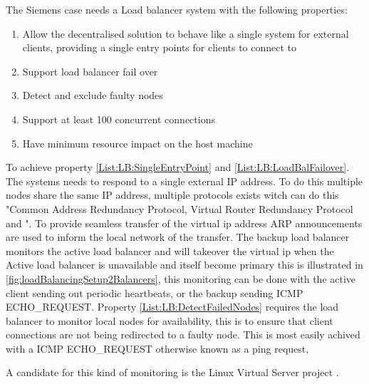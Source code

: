 The Siemens case needs a Load balancer system with the following properties:
\begin{enumerate}[label=\textbf{P.\arabic*}, ref=\textit{P.\arabic*}]
	\item \label{List:LB:SingleEntryPoint}Allow the decentralised solution to behave like a single system for external clients, providing a single entry points for clients to connect to
	\item \label{List:LB:LoadBalFailover} Support load balancer fail over
	\item \label{List:LB:DetectFailedNodes} Detect and exclude faulty nodes 
	\item Support at least 100 concurrent connections
	\item Have minimum resource impact on the host machine
\end{enumerate}


To achieve property \ref{List:LB:SingleEntryPoint} and \ref{List:LB:LoadBalFailover}.
The systems needs to respond to a single external IP address. To do this multiple nodes share the same IP address, multiple protocols exists witch can do this "Common Address Redundancy Protocol, Virtual Router Redundancy Protocol and \cite{zhang2000linuxVirtualServer}". To provide seamless transfer of the virtual ip address ARP announcements are used to inform the local network of the transfer. The backup load balancer monitors the active load balancer and will takeover the virtual ip when the Active load balancer is unavailable and itself become primary this is illustrated in \cref{fig:loadBalancingSetup2Balancers}, this monitoring can be done with the active client sending out periodic heartbeats, or the backup sending ICMP ECHO\_REQUEST.
Property \ref{List:LB:DetectFailedNodes} requires the load balancer to monitor local nodes for availability, this is to ensure that client connections are not being redirected to a faulty node. This is most easily achived with a ICMP ECHO\_REQUEST otherwise known as a ping request, 


A candidate for this kind of monitoring is the Linux Virtual Server project \cite{zhang2000linuxVirtualServer}.



